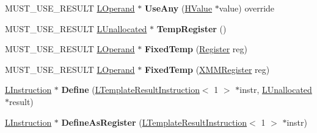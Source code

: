 \begin{DoxyCompactItemize}
\item 
M\+U\+S\+T\+\_\+\+U\+S\+E\+\_\+\+R\+E\+S\+U\+LT \hyperlink{classv8_1_1internal_1_1_l_operand}{L\+Operand} $\ast$ {\bfseries Use\+Any} (\hyperlink{classv8_1_1internal_1_1_h_value}{H\+Value} $\ast$value) override\hypertarget{classv8_1_1internal_1_1_l_chunk_builder_a61cb5c69ba1d82ff575d5d84ff6d1721}{}\label{classv8_1_1internal_1_1_l_chunk_builder_a61cb5c69ba1d82ff575d5d84ff6d1721}

\item 
M\+U\+S\+T\+\_\+\+U\+S\+E\+\_\+\+R\+E\+S\+U\+LT \hyperlink{classv8_1_1internal_1_1_l_unallocated}{L\+Unallocated} $\ast$ {\bfseries Temp\+Register} ()\hypertarget{classv8_1_1internal_1_1_l_chunk_builder_a4ba4ae71849e93fc59cb527dce3dbeea}{}\label{classv8_1_1internal_1_1_l_chunk_builder_a4ba4ae71849e93fc59cb527dce3dbeea}

\item 
M\+U\+S\+T\+\_\+\+U\+S\+E\+\_\+\+R\+E\+S\+U\+LT \hyperlink{classv8_1_1internal_1_1_l_operand}{L\+Operand} $\ast$ {\bfseries Fixed\+Temp} (\hyperlink{structv8_1_1internal_1_1_register}{Register} reg)\hypertarget{classv8_1_1internal_1_1_l_chunk_builder_a0e9a78fbc1b87c8a44c721e93143b26e}{}\label{classv8_1_1internal_1_1_l_chunk_builder_a0e9a78fbc1b87c8a44c721e93143b26e}

\item 
M\+U\+S\+T\+\_\+\+U\+S\+E\+\_\+\+R\+E\+S\+U\+LT \hyperlink{classv8_1_1internal_1_1_l_operand}{L\+Operand} $\ast$ {\bfseries Fixed\+Temp} (\hyperlink{structv8_1_1internal_1_1_double_register}{X\+M\+M\+Register} reg)\hypertarget{classv8_1_1internal_1_1_l_chunk_builder_a7ea6f4f9c364d73519c40ed66550b24b}{}\label{classv8_1_1internal_1_1_l_chunk_builder_a7ea6f4f9c364d73519c40ed66550b24b}

\item 
\hyperlink{classv8_1_1internal_1_1_l_instruction}{L\+Instruction} $\ast$ {\bfseries Define} (\hyperlink{classv8_1_1internal_1_1_l_template_result_instruction}{L\+Template\+Result\+Instruction}$<$ 1 $>$ $\ast$instr, \hyperlink{classv8_1_1internal_1_1_l_unallocated}{L\+Unallocated} $\ast$result)\hypertarget{classv8_1_1internal_1_1_l_chunk_builder_afd009a30c72fe37dd1b35d4241854ca0}{}\label{classv8_1_1internal_1_1_l_chunk_builder_afd009a30c72fe37dd1b35d4241854ca0}

\item 
\hyperlink{classv8_1_1internal_1_1_l_instruction}{L\+Instruction} $\ast$ {\bfseries Define\+As\+Register} (\hyperlink{classv8_1_1internal_1_1_l_template_result_instruction}{L\+Template\+Result\+Instruction}$<$ 1 $>$ $\ast$instr)\hypertarget{classv8_1_1internal_1_1_l_chunk_builder_af4f9a5078553b1f743899df249a25b31}{}\label{classv8_1_1internal_1_1_l_chunk_builder_af4f9a5078553b1f743899df249a25b31}


\end{DoxyCompactItemize}
